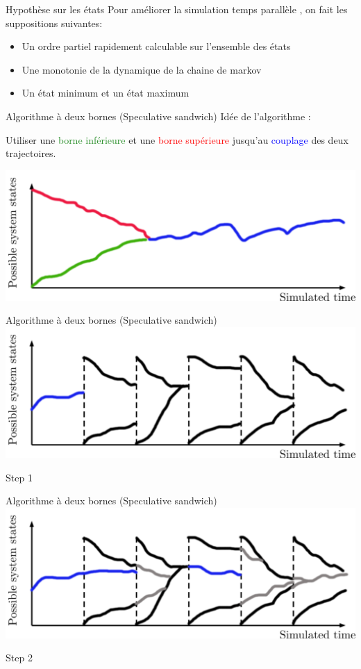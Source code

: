 \documentclass[10pt,usenames,dvipsnames]{beamer}
\begin{document}
\begin{frame}{Hypothèse sur les états}
  \centering
Pour améliorer la simulation temps parallèle , on fait les suppositions suivantes:
  \begin{itemize}
  \item Un ordre partiel rapidement calculable sur l'ensemble des états
  \item Une monotonie de la dynamique de la chaine de markov
  \item Un état minimum et un état maximum
  \end{itemize}
   
\end{frame}

\begin{frame}{Algorithme à deux bornes (Speculative sandwich)}
  \centering
  Idée de l'algorithme : 
  
  Utiliser une \textcolor{ForestGreen}{borne inférieure} et une \textcolor{red}{borne supérieure} jusqu'au \textcolor{blue}{couplage} des deux trajectoires.
  
	   \includegraphics [width=\textwidth]{coupling} 
\end{frame}


\begin{frame}{Algorithme à deux bornes (Speculative sandwich)}
  \centering
	   \includegraphics [width=\textwidth]{step0} 
	   
	   Step 1
\end{frame}

\begin{frame}{Algorithme à deux bornes (Speculative sandwich)}
  \centering
	   \includegraphics [width=\textwidth]{step1} 
	   
	   Step 2
\end{frame}
\end{document}
